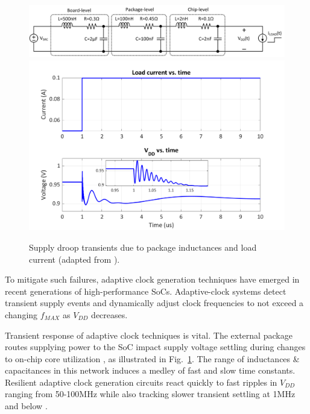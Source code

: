 \documentclass[twoside,9pt,journal,letterpage]{IEEEtran}
\begin{document}
\begin{figure}[h]
	\centering
	\includegraphics[width=\columnwidth]{fig_droop_schem}
	\includegraphics[width=\columnwidth]{fig_droop}
	\caption{Supply droop transients due to package inductances and load current (adapted from \cite{hashimoto2018}).}
	\label{fig:droop}
\end{figure}

To mitigate such failures, adaptive clock generation techniques have emerged in recent generations of high-performance SoCs\cite{ahmad2017,hashimoto2018,wilcox2015,floyd2017,bowman2016}. Adaptive-clock systems detect transient supply events and dynamically adjust clock frequencies to not exceed a changing $f_{MAX}$ as $V_{DD}$ decreases. 

Transient response of adaptive clock techniques is vital. The external package routes supplying power to the SoC impact supply voltage settling during changes to on-chip core utilization \cite{hashimoto2018}, as illustrated in Fig.\ \ref{fig:droop}. The range of inductances \& capacitances in this network induces a medley of fast and slow time constants. Resilient adaptive clock generation circuits react quickly to fast ripples in $V_{DD}$ ranging from 50-100MHz \cite{hashimoto2018,wilcox2015} while also tracking slower transient settling at 1MHz and below \cite{hashimoto2018,bowman2016,wilcox2015}.
\end{document}
